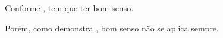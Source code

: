 \documentclass{article}
\begin{document}
Conforme \citeauthor{referencia1}, tem que ter bom senso.

Porém, como demonstra \cite{referencia2}, bom senso não se aplica sempre.



\end{document}
